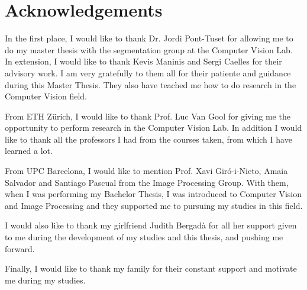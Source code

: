
\chapter*{Acknowledgements}
\label{cha:ack}

In the first place, I would like to thank Dr. Jordi Pont-Tuset for allowing me to do my master thesis with the segmentation group at the Computer Vision Lab. 
In extension, I would like to thank Kevis Maninis and Sergi Caelles for their advisory work. 
I am very gratefully to them all for their patiente and guidance during this Master Thesis. 
They also have teached me how to do research in the Computer Vision field.

From ETH Z\"urich, I would like to thank Prof. Luc Van Gool for giving me the opportunity to perform research in the Computer Vision Lab.
In addition I would like to thank all the professors I had from the courses taken, from which I have learned a lot.

From UPC Barcelona, I would like to mention Prof. Xavi Gir\'o-i-Nieto, Amaia Salvador and Santiago Pascual from the Image Processing Group. 
With them, when I was performing my Bachelor Thesis, I was introduced to Computer Vision and Image Processing and they supported me to pursuing my studies in this field.

I would also like to thank my girlfriend Judith Bergad\`a for all her support given to me during the development of my studies and this thesis, and pushing me forward.

Finally, I would like to thank my family for their constant support and motivate me during my studies. 
